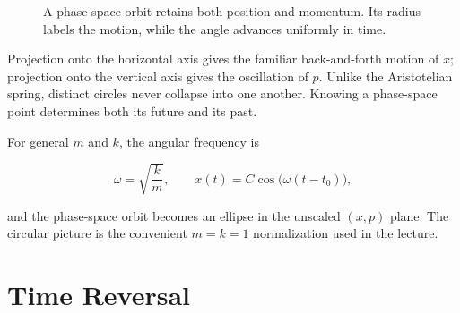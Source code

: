 \begin{figure}[htbp]
  \centering
  \caption{A phase-space orbit retains both position and momentum.  Its radius
  labels the motion, while the angle advances uniformly in time.}
  \label{fig:oscillator-phase-space}
\end{figure}

Projection onto the horizontal axis gives the familiar back-and-forth motion
of \(x\); projection onto the vertical axis gives the oscillation of \(p\).
Unlike the Aristotelian spring, distinct circles never collapse into one
another.  Knowing a phase-space point determines both its future and its past.

For general \(m\) and \(k\), the angular frequency is

\begin{equation}
  \omega=\sqrt{\frac{k}{m}},
  \qquad
  x(t)=C\cos\bigl(\omega(t-t_0)\bigr),
  \label{eq:general-oscillator-frequency}
\end{equation}

and the phase-space orbit becomes an ellipse in the unscaled \((x,p)\) plane.
The circular picture is the convenient \(m=k=1\) normalization used in the
lecture.

\begin{classroomqa}
\end{classroomqa}

\section{Time Reversal}

